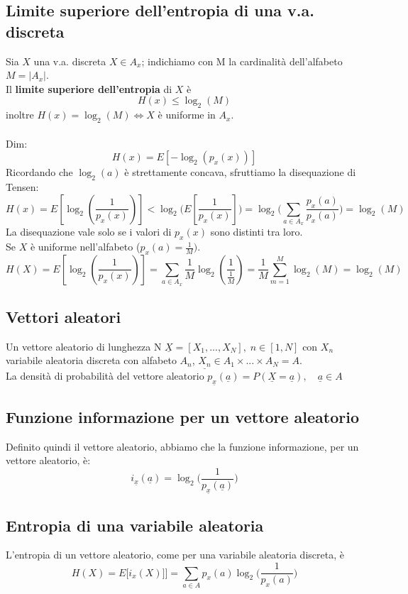 \documentclass{article}
\begin{document}
\subsection{Limite superiore dell'entropia di una v.a. discreta}
Sia $X$ una v.a. discreta $X\in A_x$; indichiamo con M la cardinalità dell'alfabeto $M=|A_x|$.\\
Il \textbf{limite superiore dell'entropia} di $X$ è
$$H(x)\leq \log_2(M)$$
inoltre $H(x)=\log_2(M)\iff X$ è uniforme in $A_x$.\\\\
Dim:
$$H(x)=E[-\log_2(p_x(x))]$$
Ricordando che $\log_2(a)$ è strettamente concava, sfruttiamo la disequazione di Tensen:
$$H(x)=E[\log_2(\frac{1}{p_x(x)})]<\log_2\biggl(E[\frac{1}{p_x(x)}]\biggl)=\log_2\biggl(\sum_{a\in A_x}\frac{p_x(a)}{p_x(a)}\biggl)=\log_2(M)$$
La disequazione vale solo se i valori di $p_x(x)$ sono distinti tra loro.\\
Se $X$ è uniforme nell'alfabeto ($p_x(a)=\frac{1}{M}).$
$$H(X)=E[\log_2(\frac{1}{p_x(x)})]=\sum_{a\in A_x}\frac{1}{M}\log_2(\frac{1}{\frac{1}{M}})=\frac{1}{M}\sum_{m=1}^M\log_2(M)=\log_2(M)$$

\subsection{Vettori aleatori}
Un vettore aleatorio di lunghezza N $\underline{X}=[X_1,...,X_N],\; n\in[1,N]$ con $X_n$ variabile aleatoria discreta con alfabeto $A_n$, $\underline{X_n}\in A_1\times ...\times A_N=A$.\\
La densità di probabilità del vettore aleatorio $p_{\underline{x}}(\underline{a})=P(\underline{X}=\underline{a}),\quad \underline{a}\in A$

\subsection{Funzione informazione per un vettore aleatorio}
Definito quindi il vettore aleatorio, abbiamo che la funzione informazione, per un vettore aleatorio, è:
$$i_{\underline{x}}(\underline{a})=\log_2\Big(\frac{1}{p_{\underline{x}}(\underline{a})}\Big)$$

\subsection{Entropia di una variabile aleatoria}
L'entropia di un vettore aleatorio, come per una variabile aleatoria discreta, è $$H(X)=E\big[i_{x}(X)]\big]=\sum_{{a}\in A}p_{{x}}({a})\log_2\big(\frac{1}{p_{{x}}({a})}\big)$$
\end{document}
